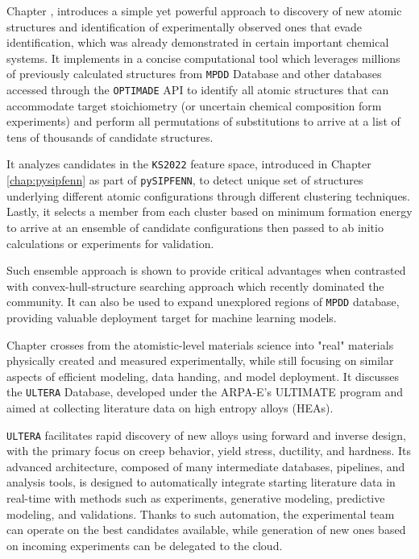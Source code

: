 Chapter , introduces a simple yet powerful approach to discovery of new atomic structures and identification of experimentally observed ones that evade identification, which was already demonstrated in certain important chemical systems. It implements in a concise computational tool which leverages millions of previously calculated structures from \texttt{MPDD} Database and other databases accessed through the \texttt{OPTIMADE} API to identify all atomic structures that can accommodate target stoichiometry (or uncertain chemical composition form experiments) and perform all permutations of substitutions to arrive at a list of tens of thousands of candidate structures. 

It analyzes candidates in the \texttt{KS2022} feature space, introduced in Chapter \ref{chap:pysipfenn} as part of \texttt{pySIPFENN}, to detect unique set of structures underlying different atomic configurations through different clustering techniques. Lastly, it selects a member from each cluster based on minimum formation energy to arrive at an ensemble of candidate configurations then passed to ab initio calculations or experiments for validation. 

Such ensemble approach is shown to provide critical advantages when contrasted with convex-hull-structure searching approach which recently dominated the community. It can also be used to expand unexplored regions of \texttt{MPDD} database, providing valuable deployment target for machine learning models.


Chapter  crosses from the atomistic-level materials science into "real" materials physically created and measured experimentally, while still focusing on similar aspects of efficient modeling, data handing, and model deployment. It discusses the \texttt{ULTERA} Database, developed under the ARPA-E's ULTIMATE program and aimed at collecting literature data on high entropy alloys (HEAs).

\texttt{ULTERA} facilitates rapid discovery of new alloys using forward and inverse design, with the primary focus on creep behavior, yield stress, ductility, and hardness. Its advanced architecture, composed of many intermediate databases, pipelines, and analysis tools, is designed to automatically integrate starting literature data in real-time with methods such as experiments, generative modeling, predictive modeling, and validations. Thanks to such automation, the experimental team can operate on the best candidates available, while generation of new ones based on incoming experiments can be delegated to the cloud.

